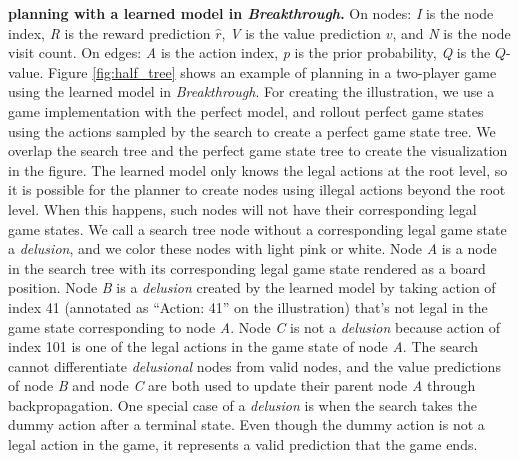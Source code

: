 {
    \textbf{\moozi planning with a learned model in \textit{Breakthrough}.}}
{
    On nodes: \textit{I} is the node index, \textit{R} is the reward prediction \(\hat{r}\), \textit{V} is the value prediction $v$, and \textit{N} is the node visit count.
    On edges: \textit{A} is the action index, \textit{p} is the prior probability, \textit{Q} is the $Q$-value.
}
Figure \ref{fig:half_tree} shows an example of \moozi planning in a two-player game using the learned model in \textit{Breakthrough}.
For creating the illustration, we use a game implementation with the perfect model, and rollout perfect game states using the actions sampled by the search to create a perfect game state tree.
We overlap the \moozi search tree and the perfect game state tree to create the visualization in the figure.
The learned model only knows the legal actions at the root level, so it is possible for the planner to create nodes using illegal actions beyond the root level.
When this happens, such nodes will not have their corresponding legal game states.
We call a search tree node without a corresponding legal game state a \textit{delusion}, and we color these nodes with light pink or white.
Node \textit{A} is a node in the search tree with its corresponding legal game state rendered as a board position.
Node \textit{B} is a \textit{delusion} created by the learned model by taking action of index 41 (annotated as ``Action: 41'' on the illustration) that's not legal in the game state corresponding to node \textit{A}.
Node \textit{C} is not a \textit{delusion} because action of index 101 is one of the legal actions in the game state of node \textit{A}.
The search cannot differentiate \textit{delusional} nodes from valid nodes, and the value predictions of node \textit{B} and node \textit{C} are both used to update their parent node \textit{A} through backpropagation.
One special case of a \textit{delusion} is when the search takes the dummy action after a terminal state.
Even though the dummy action is not a legal action in the game, it represents a valid prediction that the game ends.



